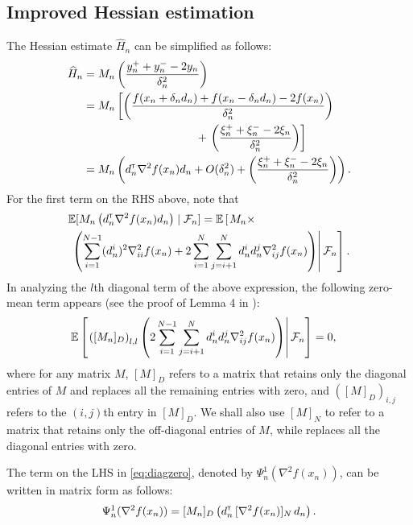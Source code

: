 \documentclass[letterpaper, 10 pt, conference]{ieeeconf}  %
\begin{document}
\subsection{Improved Hessian estimation}
The Hessian estimate $\widehat H_n$ can be simplified as follows: 
\begin{align}
\widehat H_n & = M_n \left(\dfrac{y_n^+ + y_n^- - 2 y_n}{\delta_n^2}\right) \nonumber \\
& =  M_n \left[\left(\dfrac{f(x_n+\delta_n d_n) + f(x_n-\delta_n d_n) - 2 f(x_n)}{\delta_n^2}\right) \right.\nonumber \\&\hspace{10em}+\left. \left(\dfrac{\xi_n^+ + \xi_n^- - 2 \xi_n}{\delta_n^2}\right)\right] \nonumber \\
& = M_n \left(d_n\tr \nabla^2 f(x_n) d_n +  O(\delta_n^2) + \left(\dfrac{\xi_n^+ + \xi_n^- - 2 \xi_n}{\delta_n^2} \right)\right).\label{eq:h0}
\end{align}
For the first term on the RHS above, note that 
\begin{align}
&\mathbb{E}[M_n \left(d_n^\mathsf{\scriptscriptstyle T} \nabla^2 f(x_n) d_n\right) \mid \mathcal{F}_n] =   \mathbb{E}\left[\left. M_n \times\right.\right.\nonumber\\
&\left.\left.\left(\sum\limits_{i=1}^{N-1} (d_n^i)^2 \nabla^2_{ii} f(x_n) + 2\sum\limits_{i=1}^N\sum\limits_{j=i+1}^N d_n^i d_n^j \nabla^2_{ij} f(x_n) \right)\right| \mathcal{F}_n\right]. \label{eq:h1}
\end{align}
In analyzing the $l$th diagonal term of the above expression, the following zero-mean term appears (see the proof of Lemma 4 in \cite{prashanth2015rdsa}):
\begin{align}
& \mathbb{E}\left[\left. \left([M_n]_{D}\right)_{l,l} \left(2\sum\limits_{i=1}^{N-1}\sum\limits_{j=i+1}^N d_n^i d_n^j \nabla^2_{ij} f(x_n)\right)\right| \mathcal{F}_{n}\right] = 0,\label{eq:diagzero}
\end{align}
where for any matrix $M$, $[M]_{D}$ refers to a matrix that retains only the diagonal entries of $M$ and replaces all the remaining  entries with zero, and $\left([M]_{D}\right)_{i,j}$ refers to the $(i,j)$th entry in $[M]_D$. We shall also use $[M]_{N}$ to refer to a matrix that retains only the off-diagonal entries of $M$, while replaces all the diagonal entries with zero.

The term on the LHS in \eqref{eq:diagzero}, denoted by $\Psi_{n}^{1}(\nabla^2 f(x_n))$, can be written in matrix form as follows: 
\begin{align}\label{eq:digmat}
\Psi_{n}^{1}(\nabla^2 f(x_n)) = [M_n]_{D}\left(d_{n}^\mathsf{\scriptscriptstyle T} \, [\nabla^2 f(x_n)]_{N} \, d_{n}\right).
\end{align}
\end{document}
